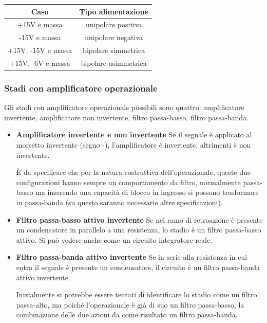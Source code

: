 \documentclass[a4paper,twocolumn,notitlepage]{book}
\begin{document}
		\begin{tabular}{|c|c|}
		\hline
		\textbf{Caso} & \textbf{Tipo alimentazione} \\
		\hline
		+15V e massa & unipolare positiva \\
		-15V e massa & unipolare negativa \\
		+15V, -15V e massa & bipolare simmetrica \\
		+15V, -6V e massa & bipolare asimmetrica \\
		\hline
		\end{tabular}
		
		\subsubsection*{Stadi con amplificatore operazionale}
		Gli stadi con amplificatore operazionale possibili sono quattro: amplificatore invertente, amplificatore non invertente, filtro passa-basso, filtro passa-banda.
		\begin{itemize}
			\item \textbf{Amplificatore invertente e non invertente}\newline
				Se il segnale è applicato al morsetto invertente (segno -), l'amplificatore è invertente, altrimenti è non invertente.
				
				È da specificare che per la natura costruttiva dell'operazionale, queste due configurazioni hanno sempre un comportamento da filtro, normalmente passa-basso ma inserendo una capacità di blocco in ingresso si possono trasformare in passa-banda (su questo saranno necessarie altre specificazioni).
			\item \textbf{Filtro passa-basso attivo invertente}\newline
			Se nel ramo di retroazione è presente un condensatore in parallelo a una resistenza, lo stadio è un filtro passa-basso attivo.
			Si può vedere anche come un circuito integratore reale.
			
			\item \textbf{Filtro passa-banda attivo invertente}\newline
			Se in serie alla resistenza in cui entra il segnale è presente un condensatore, il circuito è un filtro passa-banda attivo invertente.
			
			Inizialmente si potrebbe essere tentati di identificare lo stadio come un filtro passa-alto, ma poiché l'operazionale è già di suo un filtro passa-basso, la combinazione delle due azioni da come risultato un filtro passa-banda.
		\end{itemize}
		
\end{document}
